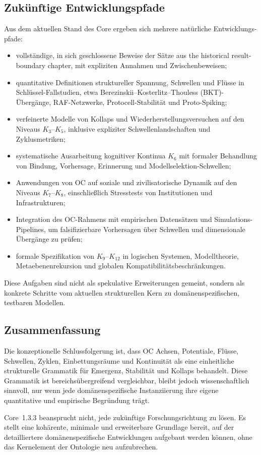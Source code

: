 \subsection{Zukünftige Entwicklungspfade}

Aus dem aktuellen Stand des Core ergeben sich mehrere natürliche Entwicklungs-
pfade:

\begin{itemize}
    \item vollständige, in sich geschlossene Beweise der Sätze aus
          the historical result-boundary chapter, mit expliziten Annahmen und Zwischenbeweisen;
    \item quantitative Definitionen struktureller Spannung, Schwellen und Flüsse in
          Schlüssel-Fallstudien, etwa Berezinskii--Kosterlitz--Thouless (BKT)-
          Übergänge, RAF-Netzwerke, Protocell-Stabilität und Proto-Spiking;
    \item verfeinerte Modelle von Kollaps und Wiederherstellungsversuchen auf den
          Niveaus \(K_3\)–\(K_5\), inklusive expliziter
          Schwellenlandschaften und Zyklusmetriken;
    \item systematische Ausarbeitung kognitiver Kontinua \(K_6\) mit formaler
          Behandlung von Bindung, Vorhersage, Erinnerung und
          Modellselektion-Schwellen;
    \item Anwendungen von OC auf soziale und zivilisatorische Dynamik auf den
          Niveaus \(K_7\)–\(K_{8}\), einschließlich Stresstests von Institutionen
          und Infrastrukturen;
    \item Integration des OC-Rahmens mit empirischen Datensätzen und
          Simulations-Pipelines, um falsifizierbare Vorhersagen über
          Schwellen und dimensionale Übergänge zu prüfen;
    \item formale Spezifikation von \(K_9\)–\(K_{12}\) in logischen
          Systemen, Modelltheorie, Metaebenenrekursion und globalen
          Kompatibilitätsbeschränkungen.
\end{itemize}

Diese Aufgaben sind nicht als spekulative Erweiterungen gemeint, sondern als
konkrete Schritte vom aktuellen strukturellen Kern zu domänenspezifischen,
testbaren Modellen.

\subsection{Zusammenfassung}

Die konzeptionelle Schlussfolgerung ist, dass OC Achsen, Potentiale, Flüsse,
Schwellen, Zyklen, Einbettungsräume und Kontinuität als eine einheitliche
strukturelle Grammatik für Emergenz, Stabilität und Kollaps behandelt.
Diese Grammatik ist bereichsübergreifend vergleichbar, bleibt jedoch wissenschaftlich
sinnvoll, nur wenn jede domänenspezifische Instanziierung ihre eigene
quantitative und empirische Begründung trägt.

Core~1.3.3 beansprucht nicht, jede zukünftige Forschungsrichtung zu lösen. Es
stellt eine kohärente, minimale und erweiterbare Grundlage bereit, auf der
detailliertere domänenspezifische Entwicklungen aufgebaut werden können,
ohne das Kernelement der Ontologie neu aufzubrechen.
